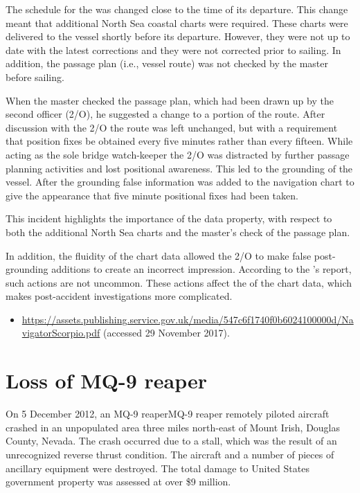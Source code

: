 The schedule for the  was changed close to the time of its departure. This change meant that additional North Sea coastal charts were required. These charts were delivered to the vessel shortly before its departure. However, they were not up to date with the latest corrections and they were not corrected prior to sailing. In addition, the passage plan (i.e., vessel route) was not checked by the master before sailing.

When the master checked the passage plan, which had been drawn up by the second officer (2/O), he suggested a change to a portion of the route. After discussion with the 2/O the route was left unchanged, but with a requirement that position fixes be obtained every five minutes rather than every fifteen. While acting as the sole bridge watch-keeper the 2/O was distracted by further passage planning activities and lost positional awareness. This led to the grounding of the vessel. After the grounding false \gls{information} was added to the navigation chart to give the appearance that five minute positional fixes had been taken.

This incident highlights the importance of the  \gls{data property}, with respect to both the additional North Sea charts and the master's check of the passage plan.

In addition, the fluidity of the chart data allowed the 2/O to make false post-grounding additions to create an incorrect impression. According to the 's report, such actions are not uncommon. These actions affect the  of the chart data, which makes post-accident investigations more complicated.

\begin{samepage}
\begin{itemize}
  \item \raggedright{\href{https://assets.publishing.service.gov.uk/media/547c6f1740f0b6024100000d/NavigatorScorpio.pdf}{https://assets.publishing.service.gov.uk/media/547c6f1740f0b6024100000d/NavigatorScorpio.pdf} (accessed 29 November 2017).}
\end{itemize}
\end{samepage}


\section{Loss of MQ-9 reaper} \label{bkm:incacc:mq9reaper}
On 5 December 2012, an MQ-9 reaperMQ-9 reaper remotely piloted aircraft crashed in an unpopulated area three miles north-east of Mount Irish, Douglas County, Nevada. The crash occurred due to a stall, which was the result of an unrecognized reverse thrust condition. The aircraft and a number of pieces of ancillary equipment were destroyed. The total damage to United States government property was assessed at over \$9 million.

